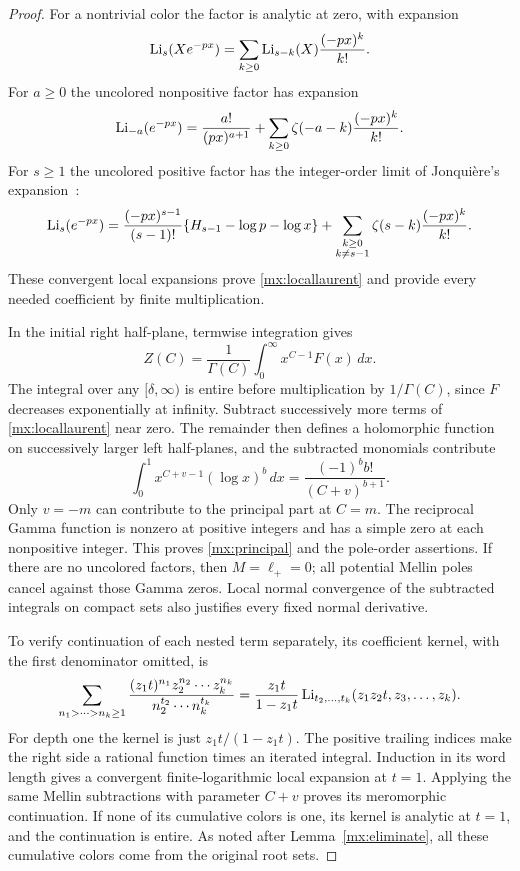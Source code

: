 \begin{proof}
For a nontrivial color the factor is analytic at zero, with expansion
\begin{equation}\label{mx:nontrivexp}
 \operatorname{Li}_s(Xe^{-px})
   =\sum_{k\geq0}\operatorname{Li}_{s-k}(X)\frac{(-px)^k}{k!}.
\end{equation}
For $a\geq0$ the uncolored nonpositive factor has expansion
\begin{equation}\label{mx:negativeexp}
 \operatorname{Li}_{-a}(e^{-px})
   =\frac{a!}{(px)^{a+1}}
      +\sum_{k\geq0}\zeta(-a-k)\frac{(-px)^k}{k!}.
\end{equation}
For $s\geq1$ the uncolored positive factor has the integer-order
limit of Jonqui\`ere's expansion~\cite[Eq.~25.12.12]{DLMFpolylog}:
\begin{equation}\label{mx:positiveexp}
 \operatorname{Li}_s(e^{-px})
  =\frac{(-px)^{s-1}}{(s-1)!}
       \{H_{s-1}-\log p-\log x\}
    +\sum_{\substack{k\geq0\\k\ne s-1}}
       \zeta(s-k)\frac{(-px)^k}{k!}.
\end{equation}
These convergent local expansions prove \eqref{mx:locallaurent} and
provide every needed coefficient by finite multiplication.

In the initial right half-plane, termwise integration gives
\begin{equation}\label{mx:mellin}
 Z(C)=\frac1{\Gamma(C)}\int_0^\infty x^{C-1}F(x)\,dx.
\end{equation}
The integral over any $[\delta,\infty)$ is entire before multiplication
by $1/\Gamma(C)$, since $F$ decreases exponentially at infinity.
Subtract successively more terms of \eqref{mx:locallaurent} near zero.
The remainder then defines a holomorphic function on successively
larger left half-planes, and the subtracted monomials contribute
\[
 \int_0^1x^{C+v-1}(\log x)^b\,dx
       =\frac{(-1)^bb!}{(C+v)^{b+1}}.
\]
Only $v=-m$ can contribute to the principal part at $C=m$.
The reciprocal Gamma function is nonzero at positive integers and
has a simple zero at each nonpositive integer.  This proves
\eqref{mx:principal} and the pole-order assertions.  If there are no
uncolored factors, then $M=\ell_+=0$; all potential Mellin poles cancel
against those Gamma zeros.  Local normal convergence of the subtracted
integrals on compact sets also justifies every fixed normal
derivative.

To verify continuation of each nested term separately, its coefficient
kernel, with the first denominator omitted, is
\[
 \sum_{n_1>\cdots>n_k\geq1}
 \frac{(z_1t)^{n_1}z_2^{n_2}\cdots z_k^{n_k}}
      {n_2^{t_2}\cdots n_k^{t_k}}
 =\frac{z_1t}{1-z_1t}
     \operatorname{Li}_{t_2,\ldots,t_k}(z_1z_2t,z_3,\ldots,z_k).
\]
For depth one the kernel is just $z_1t/(1-z_1t)$.  The positive
trailing indices make the right side a rational function times an
iterated integral.  Induction in its word length gives a convergent
finite-logarithmic local expansion at $t=1$.  Applying the same Mellin
subtractions with parameter $C+v$ proves its meromorphic continuation.
If none of its cumulative colors is one, its kernel is analytic at
$t=1$, and the continuation is entire.  As noted after
Lemma~\ref{mx:eliminate}, all these cumulative colors come from the
original root sets.
\end{proof}

